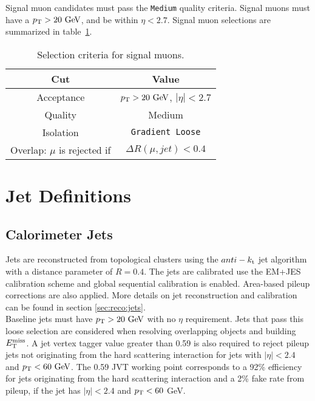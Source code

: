 \indent Signal muon candidates must pass the {\tt Medium} quality criteria.  Signal muons must have a $\pT > 20 \gev$, and be within $\eta < 2.7$.  Signal muon selections are summarized in table~\ref{tb:muons:signal}. \\  

\begin{table}[htp]
  \caption{Selection criteria for signal muons.} 
  \begin{center}
    \begin{tabular}{c|c} \hline \hline
      Cut & Value \\ \hline \hline
      Acceptance & $\pT > 20\gev$, $|\eta| < 2.7$ \\ \hline
      Quality & Medium \\ \hline
      Isolation & {\tt Gradient Loose} \\ \hline
      Overlap: $\mu$ is rejected if &  $ \Delta R(\mu,jet) < 0.4 $ \\ \hline
      \hline
    \end{tabular}
  \end{center}
  \label{tb:muons:signal}
\end{table}%

\section{Jet Definitions}
\subsection{Calorimeter Jets}

\indent Jets are reconstructed from topological clusters using the $anti-k_{\rm{t}}$ jet algorithm~\cite{antikt} with a distance parameter of $R = 0.4$.  The jets are calibrated use the EM+JES calibration scheme and global sequential calibration is enabled. Area-based pileup corrections are also applied. More details on jet reconstruction and calibration can be found in section \ref{sec:reco:jets}. \\
  
\indent Baseline jets must have $\pT > 20\gev$ with no $\eta$ requirement. Jets that pass this loose selection are considered when resolving overlapping objects and building $E_{\mathrm{T}}^{\mathrm{miss}}$.  A jet vertex tagger value greater than 0.59 is also required to reject pileup jets not originating from the hard scattering interaction for jets with $|\eta|<2.4$ and $\pt < 60 \gev$.  The 0.59 JVT working point corresponds to a 92\% efficiency for jets originating from the hard scattering interaction and a 2\% fake rate from pileup, if the jet has $|\eta|<2.4$ and $p_{\mathrm{T}}<60$ GeV. \\

